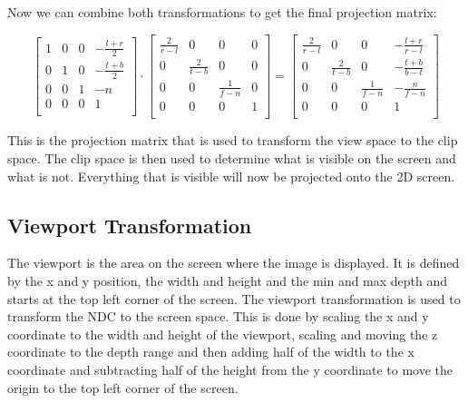 \documentclass[12pt]{report} \usepackage{preamble}
\begin{document}
Now we can combine both transformations to get the final projection matrix:

\[
	\begin{bmatrix}
		1 & 0 & 0 & -\frac{l + r}{2} \\
		0 & 1 & 0 & -\frac{t + b}{2} \\
		0 & 0 & 1 & -n               \\
		0 & 0 & 0 & 1                \\
	\end{bmatrix}
	\cdot
	\begin{bmatrix}
		\frac{2}{r - l} & 0               & 0               & 0 \\
		0               & \frac{2}{t - b} & 0               & 0 \\
		0               & 0               & \frac{1}{f - n} & 0 \\
		0               & 0               & 0               & 1 \\
	\end{bmatrix}
	=
	\begin{bmatrix}
		\frac{2}{r - l} & 0               & 0               & -\frac{l + r}{r - l} \\
		0               & \frac{2}{t - b} & 0               & -\frac{t + b}{b - t} \\
		0               & 0               & \frac{1}{f - n} & -\frac{n}{f - n}     \\
		0               & 0               & 0               & 1                    \\
	\end{bmatrix}
\]

This is the projection matrix that is used to transform the view space to the clip space.
The clip space is then used to determine what is visible on the screen and what is not.
Everything that is visible will now be projected onto the 2D screen.

\subsection{Viewport Transformation}

The viewport is the area on the screen where the image is displayed.
It is defined by the x and y position, the width and height and the
min and max depth and starts at the top left corner of the screen.
The viewport transformation is used to transform the NDC to the screen space.
This is done by scaling the x and y coordinate to the width and height of the viewport,
scaling and moving the z coordinate to the depth range and then adding
half of the width to the x coordinate and subtracting half of the height from the y coordinate
to move the origin to the top left corner of the screen.
\end{document}
